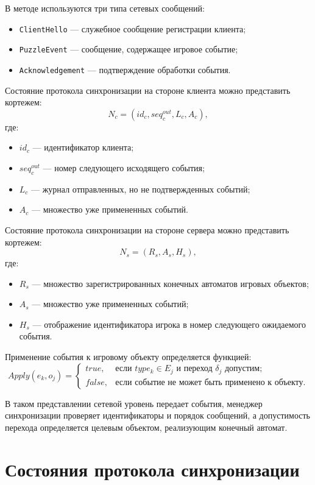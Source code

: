В методе используются три типа сетевых сообщений:
\begin{itemize}
	\item \texttt{ClientHello} --- служебное сообщение регистрации клиента;
	\item \texttt{PuzzleEvent} --- сообщение, содержащее игровое событие;
	\item \texttt{Acknowledgement} --- подтверждение обработки события.
\end{itemize}

Состояние протокола синхронизации на стороне клиента можно представить кортежем:
\[
	N_c = \left(id_c, seq_c^{out}, L_c, A_c\right),
\]
где:
\begin{itemize}
	\item $id_c$ --- идентификатор клиента;
	\item $seq_c^{out}$ --- номер следующего исходящего события;
	\item $L_c$ --- журнал отправленных, но не подтвержденных событий;
	\item $A_c$ --- множество уже примененных событий.
\end{itemize}

Состояние протокола синхронизации на стороне сервера можно представить кортежем:
\[
	N_s = \left(R_s, A_s, H_s\right),
\]
где:
\begin{itemize}
	\item $R_s$ --- множество зарегистрированных конечных автоматов игровых объектов;
	\item $A_s$ --- множество уже примененных событий;
	\item $H_s$ --- отображение идентификатора игрока в номер следующего ожидаемого события.
\end{itemize}

Применение события к игровому объекту определяется функцией:
\[
	Apply(e_k, o_j) =
	\begin{cases}
		true, & \text{если } type_k \in E_j \text{ и переход } \delta_j \text{ допустим};\\
		false, & \text{если событие не может быть применено к объекту}.
	\end{cases}
\]

В таком представлении сетевой уровень передает события, менеджер синхронизации проверяет идентификаторы и порядок сообщений, а допустимость перехода определяется целевым объектом, реализующим конечный автомат.

\section{Состояния протокола синхронизации}

